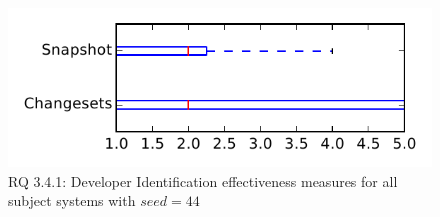 
\begin{figure}
\centering
\includegraphics[height=0.4\textheight]{figures/dit_seed/rq1_tiny_44}
\caption{RQ 3.4.1: Developer Identification effectiveness measures for all subject systems with $seed=44$}
\label{fig:dit_seed:rq1:tiny}
\end{figure}
